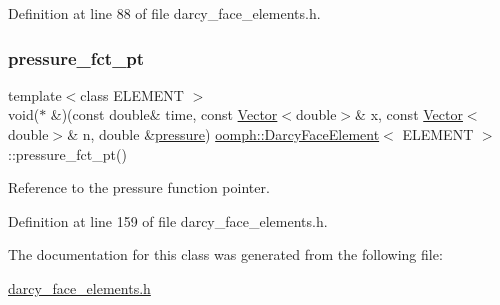 Definition at line 88 of file darcy\+\_\+face\+\_\+elements.\+h.

\mbox{\label{classoomph_1_1DarcyFaceElement_a0e7484949e8e729373a47073fb9d0ac9}} 
\subsubsection{\texorpdfstring{pressure\+\_\+fct\+\_\+pt}{pressure\_fct\_pt}}
{\footnotesize\ttfamily template$<$class E\+L\+E\+M\+E\+NT $>$ \\
void($\ast$ \&)(const double\& time, const \hyperlink{classoomph_1_1Vector}{Vector}$<$double$>$\& x, const \hyperlink{classoomph_1_1Vector}{Vector}$<$double$>$\& n, double \&\hyperlink{classoomph_1_1DarcyFaceElement_acb4492022eed505e3b41ee47a6b3bcaa}{pressure}) \hyperlink{classoomph_1_1DarcyFaceElement}{oomph\+::\+Darcy\+Face\+Element}$<$ E\+L\+E\+M\+E\+NT $>$\+::pressure\+\_\+fct\+\_\+pt()\hspace{0.3cm}{\ttfamily [inline]}}



Reference to the pressure function pointer. 



Definition at line 159 of file darcy\+\_\+face\+\_\+elements.\+h.



The documentation for this class was generated from the following file\+:\begin{DoxyCompactItemize}
\item 
\hyperlink{darcy__face__elements_8h}{darcy\+\_\+face\+\_\+elements.\+h}\end{DoxyCompactItemize}
